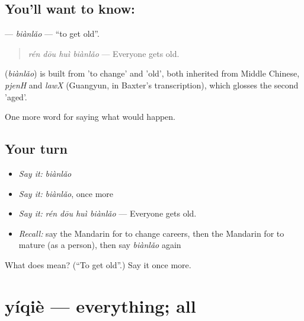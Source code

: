\subsection*{You'll want to know: }
\textbf{} — \emph{biànlǎo} — \textquotedblleft{}to get old\textquotedblright{}.

\begin{quote}
\textbf{} \emph{rén dōu huì biànlǎo} — Everyone gets old.
\end{quote}

\begin{cousinweb}
\textbf{} (\emph{biànlǎo}) is built from  'to change' and  'old', both inherited from Middle Chinese, \emph{pjenH} and \emph{lawX} (Guangyun, in Baxter's transcription), which glosses the second 'aged'.
\end{cousinweb}

\begin{grammarlens}[title={What you've built}]
One more word for saying what would happen.
\end{grammarlens}

\subsection*{Your turn}
\begin{itemize}
\raggedright
  \item \emph{Say it:} \emph{biànlǎo}
  \item \emph{Say it:} \emph{biànlǎo}, once more
  \item \emph{Say it:} \emph{rén dōu huì biànlǎo} — Everyone gets old.
  \item \emph{Recall:} say the Mandarin for to change careers, then the Mandarin for to mature (as a person), then say \emph{biànlǎo} again
\end{itemize}

\begin{tcolorbox}[breakable,colback=teal!4,colframe=teal!35!black,title={Before you move on}]
What does  mean? (\textquotedblleft{}To get old\textquotedblright{}.) Say it once more.
\end{tcolorbox}
\section[yíqiè]{yíqiè — everything; all}

\label{lesson:ZH-C401-yiqie}



